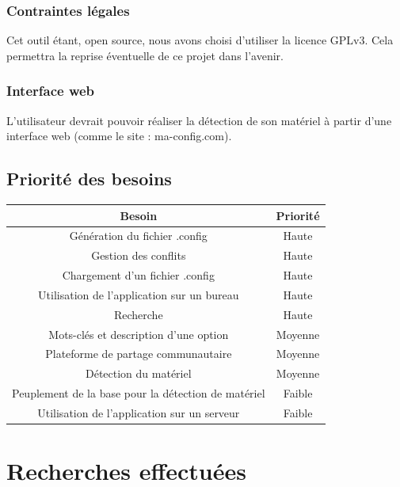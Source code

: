 \documentclass[16pts]{report}
\begin{document}
\subsubsection{Contraintes légales}
\label{sec:Contraintes légales}

Cet outil étant, open source, nous avons choisi d’utiliser la licence GPLv3.
Cela permettra la reprise éventuelle de ce projet dans l’avenir.

\subsubsection{Interface web}
\label{sec:Interface web}

L’utilisateur devrait pouvoir réaliser la détection de son matériel à partir
d’une interface web (comme le site : ma-config.com).

        \subsection{Priorité des besoins}
        \label{sub:Priorité des besoins}

\begin{tabular}{|c|c|}
    \hline
    Besoin & Priorité \\
    \hline
    \hline
    Génération du fichier .config & Haute \\
    \hline
    Gestion des conflits & Haute \\
    \hline
    Chargement d'un fichier .config & Haute \\
    \hline
    Utilisation de l'application sur un bureau & Haute \\
    \hline
    Recherche & Haute \\
    \hline
    Mots-clés et description d'une option & Moyenne \\
    \hline
    Plateforme de partage communautaire & Moyenne \\
    \hline
    Détection du matériel & Moyenne \\
    \hline
    Peuplement de la base pour la détection de matériel & Faible \\
    \hline
    Utilisation de l'application sur un serveur & Faible \\
    \hline
\end{tabular}


    \section{Recherches effectuées}
    \label{sec:Recherches effectuées}
\end{document}
